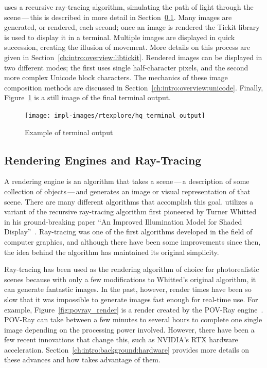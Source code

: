 \name{} uses a recursive ray-tracing algorithm, simulating the path of light through the scene\,---\,this is described in more detail in Section~\ref{ch:intro:overview:raytracing}.
Many images are generated, or rendered, each second; once an image is rendered the Tickit library~\cite{libtickitLibrary} is used to display it in a terminal.
Multiple images are displayed in quick succession, creating the illusion of movement.
More details on this process are given in Section~\ref{ch:intro:overview:libtickit}.
Rendered images can be displayed in two different modes; the first uses single half-character pixels, and the second more complex Unicode block characters.
The mechanics of these image composition methods are discussed in Section~\ref{ch:intro:overview:unicode}.
Finally, Figure~\ref{fig:terminal_output} is a still image of the final terminal output.

\begin{figure}[htb]
  \centering
  \texttt{[image: impl-images/rtexplore/hq\_terminal\_output]}
  \caption{Example of terminal output}
\label{fig:terminal_output}
\end{figure}

\subsection{Rendering Engines and Ray-Tracing}
\label{ch:intro:overview:raytracing}

A rendering engine is an algorithm that takes a scene\,---\,a description of some collection of objects\,---\,and generates an image or visual representation of that scene.
There are many different algorithms that accomplish this goal.
\name{} utilizes a variant of the recursive ray-tracing algorithm first pioneered by Turner Whitted in his ground-breaking paper ``An Improved Illumination Model for Shaded Display''~\cite{whitted1980improved}.
Ray-tracing was one of the first algorithms developed in the field of computer graphics, and although there have been some improvements since then, the idea behind the algorithm has maintained its original simplicity.

Ray-tracing has been used as the rendering algorithm of choice for photorealistic scenes because with only a few modifications to Whitted's original algorithm, it can generate fantastic images.
In the past, however, render times have been so slow that it was impossible to generate images fast enough for real-time use.
For example, Figure~\ref{fig:povray_render} is a render created by the POV-Ray engine~\cite{povray}.
POV-Ray can take between a few minutes to several hours to complete one single image depending on the processing power involved.
However, there have been a few recent innovations that change this, such as NVIDIA's RTX hardware acceleration.
Section~\ref{ch:intro:background:hardware} provides more details on these advances and how \name{} takes advantage of them.

